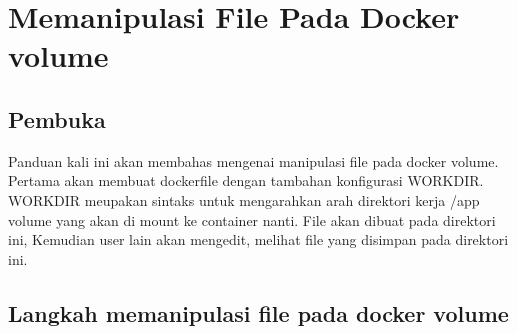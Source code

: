 \chapter{Memanipulasi File Pada Docker volume}
\section{Pembuka}
Panduan kali ini akan membahas mengenai manipulasi file pada docker volume. Pertama akan membuat dockerfile dengan tambahan konfigurasi WORKDIR.
WORKDIR meupakan sintaks untuk mengarahkan arah direktori kerja /app volume yang akan di mount ke container nanti. File akan dibuat pada direktori ini, Kemudian
user lain akan mengedit, melihat file yang disimpan pada direktori ini.

\section{Langkah memanipulasi file pada docker volume}
